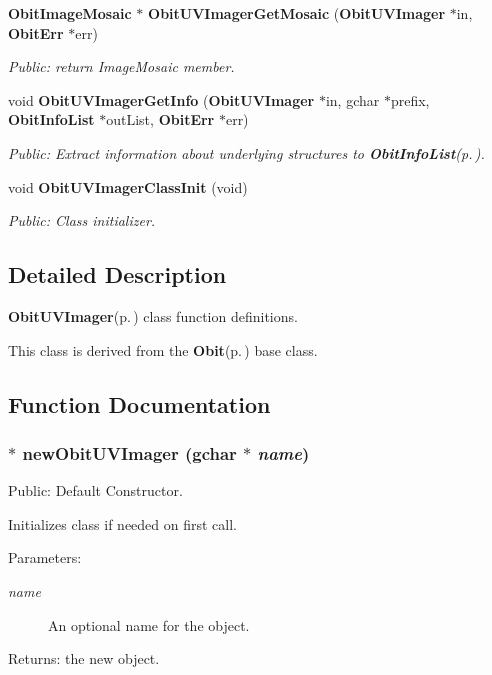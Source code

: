 \begin{CompactItemize}
{\bf Obit\-Image\-Mosaic} $\ast$ {\bf Obit\-UVImager\-Get\-Mosaic} ({\bf Obit\-UVImager} $\ast$in, {\bf Obit\-Err} $\ast$err)
\begin{CompactList}\small\item\em Public: return Image\-Mosaic member. \item\end{CompactList}\item 
void {\bf Obit\-UVImager\-Get\-Info} ({\bf Obit\-UVImager} $\ast$in, gchar $\ast$prefix, {\bf Obit\-Info\-List} $\ast$out\-List, {\bf Obit\-Err} $\ast$err)
\begin{CompactList}\small\item\em Public: Extract information about underlying structures to {\bf Obit\-Info\-List}{\rm (p.\,\pageref{structObitInfoList})}. \item\end{CompactList}\item 
void {\bf Obit\-UVImager\-Class\-Init} (void)
\begin{CompactList}\small\item\em Public: Class initializer. \item\end{CompactList}\end{CompactItemize}


\subsection{Detailed Description}
{\bf Obit\-UVImager}{\rm (p.\,\pageref{structObitUVImager})} class function definitions. 

This class is derived from the {\bf Obit}{\rm (p.\,\pageref{structObit})} base class.

\subsection{Function Documentation}
\subsubsection{$\ast$ new\-Obit\-UVImager (gchar $\ast$ {\em name})}\label{ObitUVImager_8c_a6}


Public: Default Constructor. 

Initializes class if needed on first call. \begin{Desc}
\item[Parameters:]
\begin{description}
\item[{\em name}]An optional name for the object. \end{description}
\end{Desc}
\begin{Desc}
\item[Returns:]the new object. \end{Desc}
